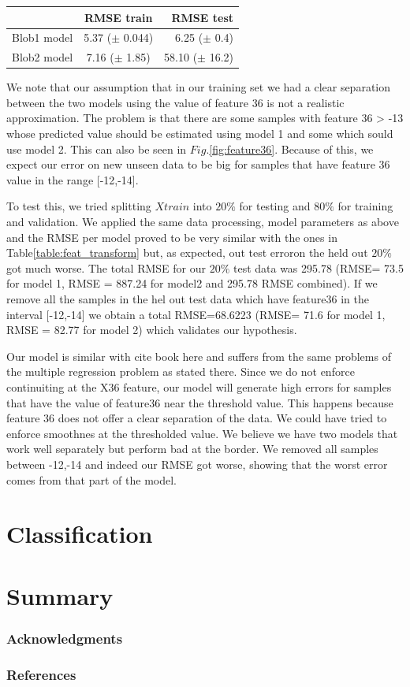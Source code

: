 \documentclass{article} %
\begin{document}
\begin{center}
  \begin{tabular}{ |l | c | r| }
    \hline
     & RMSE train & RMSE test \\ \hline
    Blob1 model & 5.37 ($\pm$ 0.044) & 6.25 ($\pm$ 0.4) \\ \hline
    Blob2 model & 7.16 ($\pm$ 1.85) & 58.10 ($\pm$ 16.2) \\
    \hline
  \end{tabular}
  	\label{table:feat_transform}
\end{center}

We note that our assumption that in our training set we had a clear separation between the two models using the value of feature 36 is not a realistic approximation. The problem is that there are some samples with feature 36 > -13 whose predicted value should be estimated using model 1 and some which sould use model 2. This can also be seen in $Fig.$\ref{fig:feature36}.
 Because of this, we expect our error on new unseen data to be big for samples that have feature 36 value in the range [-12,-14].
 
To test this, we tried splitting $Xtrain$ into $20\%$ for testing and $80\%$ for training and validation. We applied the same data processing, model parameters as above and the RMSE per model proved to be very similar with the ones in Table\ref{table:feat_transform} but, as expected, out test erroron the held out $20\%$ got much worse. The total RMSE for our $20\%$  test data was 295.78 (RMSE= 73.5 for model 1, RMSE = 887.24 for model2 and 295.78 RMSE combined).
If we remove all the samples in the hel out test data which have feature36 in the interval [-12,-14] we obtain a total RMSE=68.6223 (RMSE= 71.6 for model 1, RMSE = 82.77 for model 2) which validates our hypothesis.


Our model is similar with cite book here and suffers from the same problems of the multiple regression problem as stated there.
Since we do not enforce continuiting at the X36 feature, our model will generate high errors for samples that have the value of feature36 near the threshold value. This happens because feature 36 does not offer a clear separation of the data. We could have tried to enforce smoothnes at the thresholded value. We believe we have two models that work well separately but perform bad at the border. We removed all samples between -12,-14 and indeed our RMSE got worse, showing that the worst error comes from that part of the model.


\section{Classification}





\section{Summary}


\subsubsection*{Acknowledgments}

\subsubsection*{References}
\end{document}
